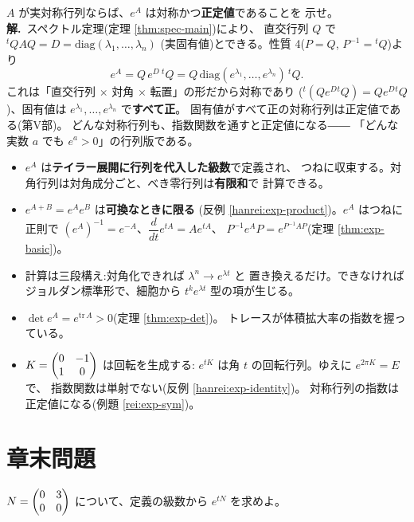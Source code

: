 \begin{rei}[例題・標準(証明:対称行列の指数関数)]\label{rei:exp-sym}
$A$ が実対称行列ならば、$e^{A}$ は対称かつ\textbf{正定値}であることを
示せ。\\
\textbf{解.}\ スペクトル定理(定理 \ref{thm:spec-main})により、
直交行列 $Q$ で ${}^t\!QAQ = D = \mathrm{diag}(\lambda_1, \dots, \lambda_n)$
(実固有値)とできる。性質 4($P = Q$, $P^{-1} = {}^t\!Q$)より
\[
e^{A} = Q\,e^{D}\,{}^t\!Q
= Q\,\mathrm{diag}(e^{\lambda_1}, \dots, e^{\lambda_n})\,{}^t\!Q.
\]
これは「直交行列 $\times$ 対角 $\times$ 転置」の形だから対称であり
(${}^t(Qe^{D}{}^t\!Q) = Qe^{D}{}^t\!Q$)、固有値は
$e^{\lambda_1}, \dots, e^{\lambda_n}$ で\textbf{すべて正}。
固有値がすべて正の対称行列は正定値である(第V部)。
どんな対称行列も、指数関数を通すと正定値になる――
「どんな実数 $a$ でも $e^a > 0$」の行列版である。
\end{rei}

\begin{matome}
\begin{itemize}
\item $e^{A}$ は\textbf{テイラー展開に行列を代入した級数}で定義され、
つねに収束する。対角行列は対角成分ごと、べき零行列は\textbf{有限和}で
計算できる。
\item $e^{A+B} = e^{A}e^{B}$ は\textbf{可換なときに限る}
(反例 \ref{hanrei:exp-product})。$e^{A}$ はつねに正則で
$(e^{A})^{-1} = e^{-A}$、$\dfrac{d}{dt}e^{tA} = Ae^{tA}$、
$P^{-1}e^{A}P = e^{P^{-1}AP}$(定理 \ref{thm:exp-basic})。
\item 計算は三段構え:対角化できれば $\lambda^n \to e^{\lambda t}$ と
置き換えるだけ。できなければジョルダン標準形で、細胞から
$t^k e^{\lambda t}$ 型の項が生じる。
\item $\det e^{A} = e^{\mathrm{tr}\,A} > 0$(定理 \ref{thm:exp-det})。
トレースが体積拡大率の指数を握っている。
\item $K = \begin{pmatrix}0 & -1 \\ 1 & 0\end{pmatrix}$ は回転を生成する:
$e^{tK}$ は角 $t$ の回転行列。ゆえに $e^{2\pi K} = E$ で、
指数関数は単射でない(反例 \ref{hanrei:exp-identity})。
対称行列の指数は正定値になる(例題 \ref{rei:exp-sym})。
\end{itemize}
\end{matome}

\section*{章末問題}

\begin{mondai}[基本]\label{q:exp-ex1}
$N = \begin{pmatrix}0 & 3 \\ 0 & 0\end{pmatrix}$ について、定義の級数から $e^{tN}$ を求めよ。
\end{mondai}

